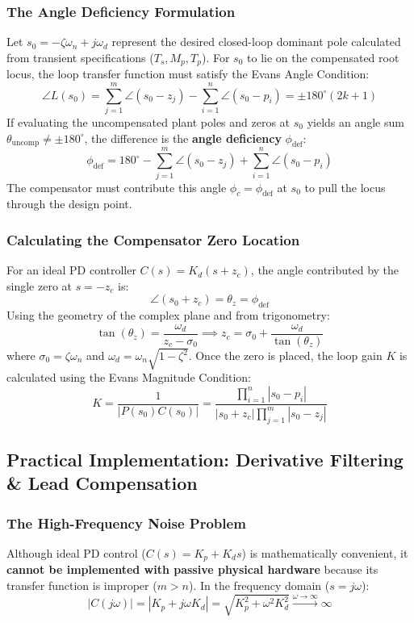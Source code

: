 \documentclass[12pt,onecolumn,twoside ]{article}
\begin{document}
	\subsubsection{The Angle Deficiency Formulation}
	Let $s_0 = -\zeta\omega_n + j\omega_d$ represent the desired closed-loop dominant pole calculated from transient specifications ($T_s, M_p, T_p$). For $s_0$ to lie on the compensated root locus, the loop transfer function must satisfy the Evans Angle Condition: \[
	\angle L(s_0) = \sum_{j=1}^{m} \angle(s_0 - z_j) - \sum_{i=1}^{n} \angle(s_0 - p_i) = \pm 180^\circ(2k + 1)
	\]
	If evaluating the uncompensated plant poles and zeros at $s_0$ yields an angle sum $\theta_{\text{uncomp}} \ne \pm 180^\circ$, the difference is the \textbf{angle deficiency} $\phi_{\text{def}}$: \[
	\phi_{\text{def}} = 180^\circ - \sum_{j=1}^{m} \angle(s_0 - z_j) + \sum_{i=1}^{n} \angle(s_0 - p_i)
	\] The compensator must contribute this angle $\phi_c = \phi_{\text{def}}$ at $s_0$ to pull the locus through the design point.
	\subsubsection{Calculating the Compensator Zero Location}
	For an ideal PD controller $C(s) = K_d(s + z_c)$, the angle contributed by the single zero at $s = -z_c$ is: \[
	\angle(s_0 + z_c) = \theta_z = \phi_{\text{def}}
	\]
	Using the geometry of the complex plane and from trigonometry: \[
	\tan(\theta_z) = \frac{\omega_d}{z_c - \sigma_0} \implies z_c = \sigma_0 + \frac{\omega_d}{\tan(\theta_z)}
	\] where $\sigma_0 = \zeta\omega_n$ and $\omega_d = \omega_n\sqrt{1 - \zeta^2}$. Once the zero is placed, the loop gain $K$ is calculated using the Evans Magnitude Condition: \[
	K = \frac{1}{|P(s_0)C(s_0)|} = \frac{\prod_{i=1}^{n} |s_0 - p_i|}{|s_0 + z_c| \prod_{j=1}^{m} |s_0 - z_j|}
	\]
	
	\subsection{Practical Implementation: Derivative Filtering \& Lead Compensation}
	\subsubsection{The High-Frequency Noise Problem}
	Although ideal PD control ($C(s) = K_p + K_d s$) is mathematically convenient, it \textbf{cannot be implemented with passive physical hardware} because its transfer function is improper ($m > n$). In the frequency domain ($s = j\omega$): \[
	|C(j\omega)| = |K_p + j\omega K_d| = \sqrt{K_p^2 + \omega^2 K_d^2} \xrightarrow{\omega \to \infty} \infty
	\]
\end{document}
